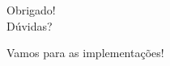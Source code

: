 \documentclass[xcolor=dvipsnames,t,aspectratio=169]{beamer}
\newcommand{\highlight}[1]{{\color{nes_dark_orange} #1}}
\begin{document}
\begin{frame}
    \frametitle{~}
    \vfill
    \begin{center}
        {\Huge Obrigado!}\vspace{1.5em}\\
        {\Large \highlight{Dúvidas?}}\\
    \end{center}
    \vfill
    \begin{center}
        {\small Vamos para as implementações!}
    \end{center}
\end{frame}
\end{document}
